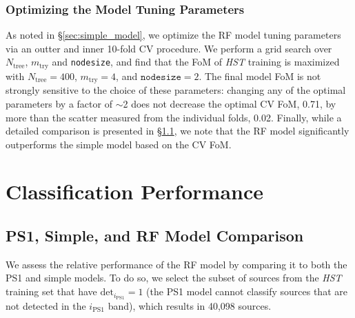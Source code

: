 \documentclass[twocolumn]{aastex62}
\begin{document}
\subsubsection{Optimizing the Model Tuning Parameters}

As noted in \S\ref{sec:simple_model}, we optimize the RF model tuning
parameters via an outter and inner 10-fold CV procedure. We perform a grid
search over $N_{\mathrm{tree}}$, $m_{\mathrm{try}}$ and \texttt{nodesize},
and find that the FoM of \textit{HST} training is maximized with
$N_{\mathrm{tree}} = 400$, $m_{\mathrm{try}} = 4$, and $\mathtt{nodesize} =
2$. The final model FoM is not strongly sensitive to the choice of these
parameters: changing any of the optimal parameters by a factor of $\sim$2
does not decrease the optimal CV FoM, 0.71, by more than the scatter
measured from the individual folds, 0.02. Finally, while a detailed
comparison is presented in \S\ref{sec:comp_hst}, we note that the RF model
significantly outperforms the simple model based on the CV FoM.

\section{Classification Performance}

\subsection{PS1, Simple, and RF Model Comparison}\label{sec:comp_hst}

We assess the relative performance of the RF model by comparing it to both
the PS1 and simple models. To do so, we select the subset of sources from
the \textit{HST} training set that have $\mathrm{det}_{i_\mathrm{PS1}} = 1$
(the PS1 model cannot classify sources that are not detected in the
$i_\mathrm{PS1}$ band), which results in 40,098 sources.
\end{document}
